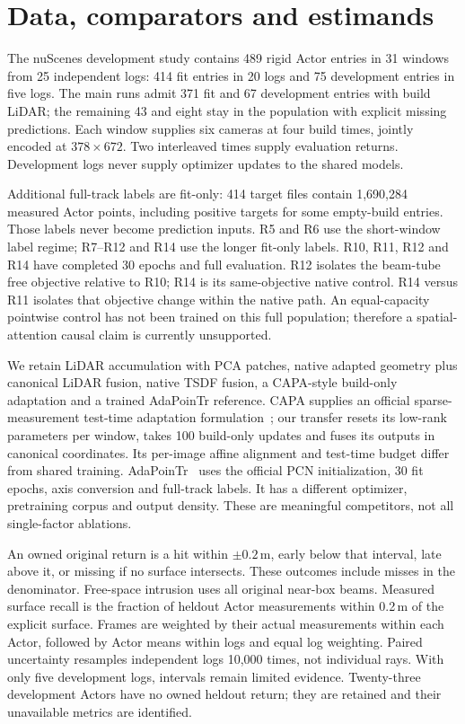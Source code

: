 \documentclass[10pt,a4paper]{article}
\begin{document}
\section{Data, comparators and estimands}
The nuScenes development study contains 489 rigid Actor entries in 31 windows
from 25 independent logs: 414 fit entries in 20 logs and 75 development entries
in five logs. The main runs admit 371 fit and 67 development entries with build
LiDAR; the remaining 43 and eight stay in the population with explicit missing
predictions. Each window supplies six cameras at four build times, jointly
encoded at $378\times672$. Two interleaved times supply evaluation returns.
Development logs never supply optimizer updates to the shared models.

Additional full-track labels are fit-only: 414 target files contain 1,690,284
measured Actor points, including positive targets for some empty-build entries.
Those labels never become prediction inputs. R5 and R6 use the short-window
label regime; R7--R12 and R14 use the longer fit-only labels. R10, R11, R12 and
R14 have completed 30 epochs and full evaluation. R12 isolates the beam-tube
free objective relative to R10; R14 is its same-objective native control.
R14 versus R11 isolates that objective change within the native path.
An equal-capacity pointwise control
has not been trained on this full population; therefore a spatial-attention
causal claim is currently unsupported.

We retain LiDAR accumulation with PCA patches, native adapted geometry plus
canonical LiDAR fusion, native TSDF fusion, a CAPA-style build-only adaptation
and a trained AdaPoinTr reference. CAPA supplies an official sparse-measurement
test-time adaptation formulation~\cite{capa}; our transfer resets its low-rank
parameters per window, takes 100 build-only updates and fuses its outputs in
canonical coordinates. Its per-image affine alignment and test-time budget
differ from shared training. AdaPoinTr~\cite{adapointr} uses the official PCN
initialization, 30 fit epochs, axis conversion and full-track labels. It has a
different optimizer, pretraining corpus and output density. These are meaningful
competitors, not all single-factor ablations.

An owned original return is a hit within $\pm0.2$\,m, early below that interval,
late above it, or missing if no surface intersects. These outcomes include
misses in the denominator. Free-space intrusion uses all original near-box
beams. Measured surface recall is the fraction of heldout Actor measurements
within 0.2\,m of the explicit surface. Frames are weighted by their actual
measurements within each Actor, followed by Actor means within logs and equal
log weighting. Paired uncertainty resamples independent logs 10,000 times,
not individual rays. With only five development logs, intervals remain
limited evidence. Twenty-three development Actors have no owned heldout
return; they are retained and their unavailable metrics are identified.
\end{document}
